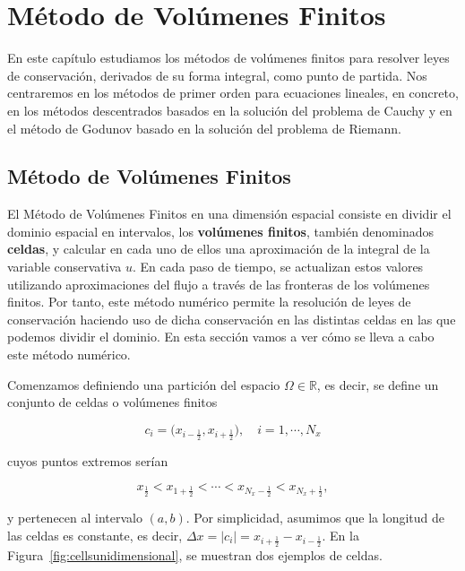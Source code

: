 \chapter{Método de Volúmenes Finitos}\label{ch:finitevolume}

En este capítulo estudiamos los métodos de volúmenes finitos para
resolver leyes de conservación, derivados de su forma integral, como
punto de partida.
Nos centraremos en los métodos de primer orden para ecuaciones
lineales, en concreto, en los métodos descentrados basados en la
solución del problema de Cauchy y en el método de Godunov basado en
la solución del problema de Riemann.

\section{Método de Volúmenes Finitos}

El Método de Volúmenes Finitos en una dimensión espacial consiste en
dividir el dominio espacial en intervalos, los
\textbf{volúmenes finitos}, también denominados \textbf{celdas}, y
calcular en cada uno de ellos una aproximación de la integral de la
variable conservativa $u$.
En cada paso de tiempo, se actualizan estos valores utilizando
aproximaciones del flujo a través de las fronteras de los volúmenes
finitos.
Por tanto, este método numérico permite la resolución de leyes de
conservación haciendo uso de dicha conservación en las distintas
celdas en las que podemos dividir el dominio.
En esta sección vamos a ver cómo se lleva a cabo este método
numérico.

Comenzamos definiendo una partición del espacio
$\Omega\in\mathbb{R}$, es decir, se define un conjunto de celdas o
volúmenes finitos

\begin{equation*}
  c_{i}=
  \big(
  x_{i-\frac{1}{2}},
  x_{i+\frac{1}{2}}
  \big),\quad
  i=1,\cdots,N_{x}
\end{equation*}

cuyos puntos extremos serían

\begin{equation*}
  x_{\frac{1}{2}}<
  x_{1+\frac{1}{2}}<
  \cdots<
  x_{N_{x}-\frac{1}{2}}<
  x_{N_{x}+\frac{1}{2}},
\end{equation*}

y pertenecen al intervalo $\left(a,b\right)$.
Por simplicidad, asumimos que la longitud de las celdas es constante,
es decir,
\begin{math}
  \Delta x=
  \left|c_{i}\right|=
  x_{i+\frac{1}{2}}-
  x_{i-\frac{1}{2}}
\end{math}.
En la Figura~\ref{fig:cellsunidimensional}, se muestran dos ejemplos
de celdas.

